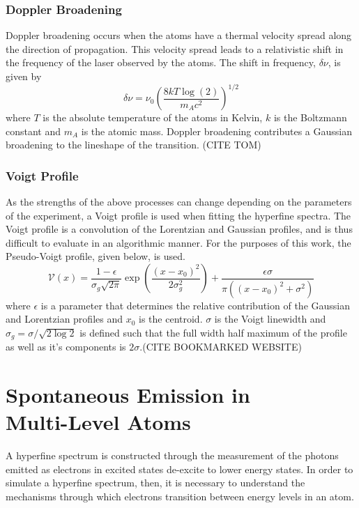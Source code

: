 \subsubsection*{Doppler Broadening}
Doppler broadening occurs when the atoms have a thermal velocity spread along the direction of propagation. This velocity spread leads to a relativistic shift in the frequency of the laser observed by the atoms. The shift in frequency, $\delta \nu$, is given by
\begin{equation}
\delta \nu = \nu_0\left(\frac{8kT\log(2)}{m_Ac^2}\right)^{1/2}
\end{equation}
where $T$ is the absolute temperature of the atoms in Kelvin, $k$ is the Boltzmann constant and $m_A$ is the atomic mass. Doppler broadening contributes a Gaussian broadening to the lineshape of the transition. (CITE TOM)

\subsubsection*{Voigt Profile}
As the strengths of the above processes can change depending on the parameters of the experiment, a Voigt profile is used when fitting the hyperfine spectra. The Voigt profile is a convolution of the Lorentzian and Gaussian profiles, and is thus difficult to evaluate in an algorithmic manner. For the purposes of this work, the Pseudo-Voigt profile, given below, is used.
\begin{equation}
\mathcal{V}(x) = \frac{1-\epsilon}{\sigma_g\sqrt{2\pi}}\exp\left(\frac{(x-x_0)^2}{2\sigma_g^2}\right)+\frac{\epsilon\sigma}{\pi((x-x_0)^2+\sigma^2)}
\end{equation}
where $\epsilon$ is a parameter that determines the relative contribution of the Gaussian and Lorentzian profiles and $x_0$ is the centroid. $\sigma$ is the Voigt linewidth and $\sigma_g = \sigma/\sqrt{2\log{2}}$ is defined such that the full width half maximum of the profile as well as it's components is $2\sigma$.(CITE BOOKMARKED WEBSITE)
\section{Spontaneous Emission in \\ Multi-Level Atoms}
\label{ALI}
A hyperfine spectrum is constructed through the measurement of the photons emitted as electrons in excited states de-excite to lower energy states. In order to simulate a hyperfine spectrum, then, it is necessary to understand the mechanisms through which electrons transition between energy levels in an atom.

